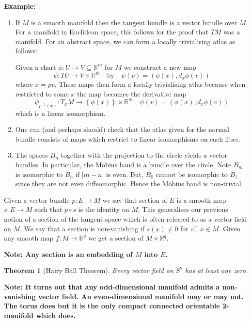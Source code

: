\documentclass[11pt]{article}
\newcommand{\abs}[1]{|#1|}
\newcommand{\R}{\mathbb{R}}
\newcommand{\mdf}[1]{{\color{RoyalBlue} #1}}
\newenvironment{note}
	{\begin{mdframed}[backgroundcolor=white, linecolor=RubineRed, roundcorner=5pt, linewidth=1pt]\bfseries{Note:}\normalfont
	\setlength{\parindent}{0pt}}
	{\end{mdframed}}
\newenvironment{eg}
	{\begin{mdframed}[backgroundcolor=mylg,roundcorner=5pt,linewidth=0pt]\bfseries{Example:}\normalfont
	\setlength{\parindent}{0pt}}
	{\end{mdframed}}
\newtheorem{theorem}{Theorem}[section]
\begin{document}
\begin{eg}
\begin{enumerate}
	\item If $M$ is a smooth manifold then the tangent bundle is a vector bundle over $M$.
		For a manifold in Euclidean space, this follows for the proof that $TM$ was a manifold.
		For an abstract space, we can form a locally trivialising atlas as follows:

		Given a chart $\phi:U\to V\subseteq\R^m$ for $M$ we construct a new map
		\[
			\psi:TU\to V\times\R^m \quad\text{by}\quad\psi(v)=(\phi(x),d_x\phi(v))
		\]
		where $x=pv$.
		These maps then form a locally trivialising atlas because when restricted to some $x$ the map becomes the derivative map
		\[
			\psi_{p^{-1}(x)}:T_x M \to \left\{\phi(x)\right\}\times\R^m \quad \psi(v)=(\phi(x), d_x\phi(v))
		\]
		which is a linear isomorphism.
	\item One can (and perhaps should) check that the atlas given for the normal bundle consists of maps which restrict to linear isomorphisms on each fibre.

	\item The spaces $B_n$ together with the projection to the circle yields a vector bundles.
		In particular, the M\"obius band is a bundle over the circle.
		Note $B_m$ is isomorphic to $B_n$ if $\abs{m-n}$ is even.
		But, $B_0$ cannot be isomorphic to $B_1$ since they are not even diffeomorphic.
		Hence the M\"obius band is non-trivial.
\end{enumerate}
\end{eg}
Given a vector bundle $p:E\to M$ we say that \mdf{section} of $E$ is a smooth map $s:E\to M$ such that $p\circ s$ is the identity on $M$.
This generalises our previous notion of a section of the tangent space which is often referred to as a \mdf{vector field} on $M$.
We say that a section is \mdf{non-vanishing} if $s(x)\neq 0$ for all $x\in M$.
Given any smooth map $f:M\to\R^q$ we get a section of $M\times\R^q$.
\begin{note}
Any section is an embedding of $M$ into $E$.
\end{note}

\begin{theorem}[Hairy Ball Theorem]
Every vector field on $S^2$ has at least one zero.
\end{theorem}

\begin{note}
	It turns out that any odd-dimensional manifold admits a non-vanishing vector field.
	An even-dimensional manifold may or may not.
	The torus does but it is the only compact connected orientable 2-manifold which does.
\end{note}
\end{document}
